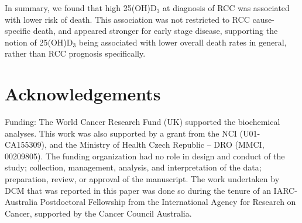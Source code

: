 \documentclass[a4paper,11pt]{article}
\begin{document}
In summary, we found that high 25(OH)D$_3$ at diagnosis of RCC was associated 
with lower risk of death. This association was not restricted to RCC 
cause-specific death, and appeared stronger for early stage disease, 
supporting the notion of 25(OH)D$_3$ being associated with lower overall death 
rates in general, rather than RCC prognosis specifically. 

\section*{Acknowledgements}
\noindent Funding:
The World Cancer Research Fund (UK) supported the biochemical analyses. This work was 
also supported by a grant from the NCI (U01-CA155309), and the Ministry of Health 
Czech Republic -- DRO (MMCI, 00209805). The funding organization had no role in 
design and conduct of the study; collection, management, analysis, and 
interpretation of the data; preparation, review, or approval of the manuscript. The 
work undertaken by DCM that was reported in this paper was done so during the tenure 
of an IARC-Australia Postdoctoral Fellowship from the International Agency for 
Research on Cancer, supported by the Cancer Council Australia. 

\clearpage


\end{document}
